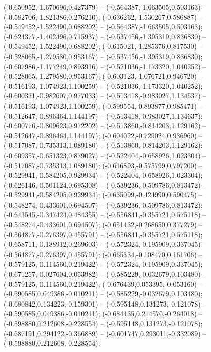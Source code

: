  (-0.650952,-1.670696,0.427379) -- (-0.564387,-1.663505,0.503163) -- (-0.582706,-1.821386,0.276210);
 (-0.636262,-1.530267,0.586887) -- (-0.549452,-1.522490,0.688202) -- (-0.564387,-1.663505,0.503163);
 (-0.624377,-1.402496,0.715937) -- (-0.537456,-1.395319,0.836830) -- (-0.549452,-1.522490,0.688202);
 (-0.615021,-1.285376,0.817530) -- (-0.528065,-1.279580,0.953167) -- (-0.537456,-1.395319,0.836830);
 (-0.607986,-1.177249,0.893916) -- (-0.521036,-1.173320,1.040252) -- (-0.528065,-1.279580,0.953167);
 (-0.603123,-1.076721,0.946720) -- (-0.516193,-1.074923,1.100259) -- (-0.521036,-1.173320,1.040252);
 (-0.600331,-0.982607,0.977033) -- (-0.513418,-0.983027,1.134637) -- (-0.516193,-1.074923,1.100259);
 (-0.599554,-0.893877,0.985471) -- (-0.512647,-0.896464,1.144197) -- (-0.513418,-0.983027,1.134637);
 (-0.600776,-0.809623,0.972202) -- (-0.513860,-0.814203,1.129162) -- (-0.512647,-0.896464,1.144197);
 (-0.604022,-0.729024,0.936960) -- (-0.517087,-0.735313,1.089180) -- (-0.513860,-0.814203,1.129162);
 (-0.609357,-0.651323,0.879027) -- (-0.522404,-0.658926,1.023304) -- (-0.517087,-0.735313,1.089180);
 (-0.616893,-0.575799,0.797200) -- (-0.529941,-0.584205,0.929934) -- (-0.522404,-0.658926,1.023304);
 (-0.626146,-0.501124,0.695308) -- (-0.539236,-0.509786,0.813472) -- (-0.529941,-0.584205,0.929934);
 (-0.635099,-0.424990,0.590475) -- (-0.548274,-0.433601,0.694507) -- (-0.539236,-0.509786,0.813472);
 (-0.643545,-0.347424,0.484355) -- (-0.556841,-0.355721,0.575118) -- (-0.548274,-0.433601,0.694507);
 (-0.651432,-0.268650,0.377279) -- (-0.564877,-0.276397,0.455791) -- (-0.556841,-0.355721,0.575118);
 (-0.658711,-0.188912,0.269603) -- (-0.572324,-0.195909,0.337045) -- (-0.564877,-0.276397,0.455791);
 (-0.665334,-0.108470,0.161706) -- (-0.579125,-0.114560,0.219422) -- (-0.572324,-0.195909,0.337045);
 (-0.671257,-0.027604,0.053982) -- (-0.585229,-0.032679,0.103480) -- (-0.579125,-0.114560,0.219422);
 (-0.676439,0.053395,-0.053160) -- (-0.590585,0.049386,-0.010211) -- (-0.585229,-0.032679,0.103480);
 (-0.680842,0.134223,-0.159301) -- (-0.595148,0.131273,-0.121078) -- (-0.590585,0.049386,-0.010211);
 (-0.684435,0.214570,-0.264018) -- (-0.598880,0.212608,-0.228554) -- (-0.595148,0.131273,-0.121078);
 (-0.687191,0.294122,-0.366889) -- (-0.601747,0.293011,-0.332089) -- (-0.598880,0.212608,-0.228554);
